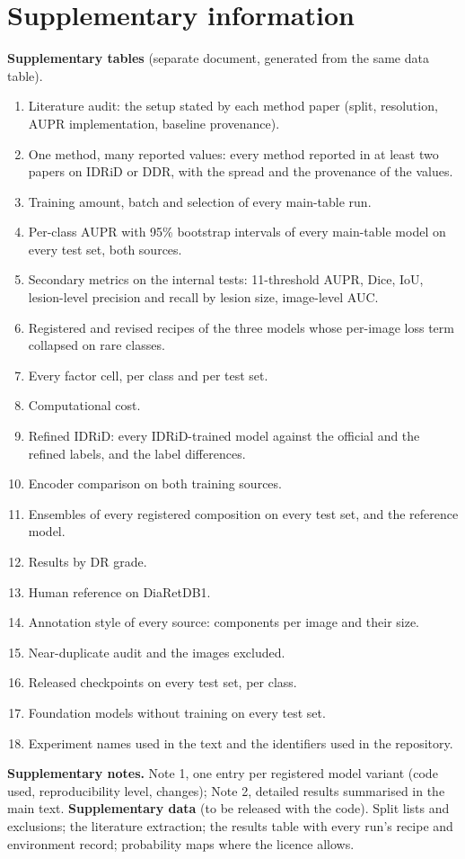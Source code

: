 \clearpage
\section{Supplementary information}
\noindent\textbf{Supplementary tables} (separate document, generated from the same data table).
\begin{enumerate}[leftmargin=*,label=\textbf{\arabic*}.,itemsep=1pt]
\item Literature audit: the setup stated by each method paper (split, resolution, AUPR implementation, baseline provenance).
\item One method, many reported values: every method reported in at least two papers on IDRiD or DDR, with the spread and the provenance of the values.
\item Training amount, batch and selection of every main-table run.
\item Per-class AUPR with 95\% bootstrap intervals of every main-table model on every test set, both sources.
\item Secondary metrics on the internal tests: 11-threshold AUPR, Dice, IoU, lesion-level precision and recall by lesion size, image-level AUC.
\item Registered and revised recipes of the three models whose per-image loss term collapsed on rare classes.
\item Every factor cell, per class and per test set.
\item Computational cost.
\item Refined IDRiD: every IDRiD-trained model against the official and the refined labels, and the label differences.
\item Encoder comparison on both training sources.
\item Ensembles of every registered composition on every test set, and the reference model.
\item Results by DR grade.
\item Human reference on DiaRetDB1.
\item Annotation style of every source: components per image and their size.
\item Near-duplicate audit and the images excluded.
\item Released checkpoints on every test set, per class.
\item Foundation models without training on every test set.
\item Experiment names used in the text and the identifiers used in the repository.
\end{enumerate}
\noindent\textbf{Supplementary notes.} Note 1, one entry per registered model variant (code used, reproducibility level, changes); Note 2, detailed results summarised in the main text. \textbf{Supplementary data} (to be released with the code). Split lists and exclusions; the literature extraction; the results table with every run's recipe and environment record; probability maps where the licence allows.
